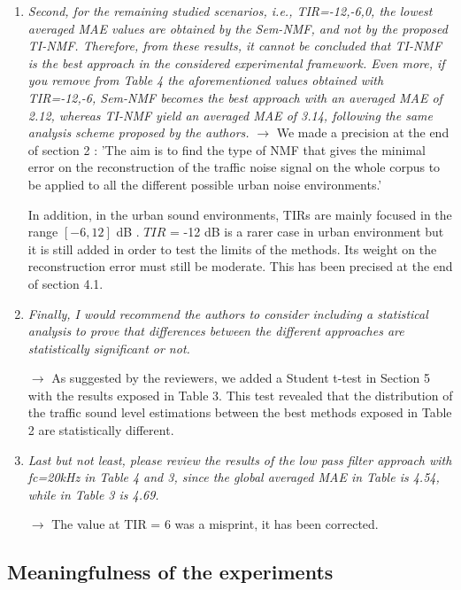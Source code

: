 \documentclass[10pt]{article}
\begin{document}
\begin{enumerate}
\item \emph{Second, for the remaining studied scenarios, i.e., TIR={-12,-6,0}, the lowest averaged MAE values are obtained by the Sem-NMF, and not by the proposed TI-NMF.
Therefore, from these results, it cannot be concluded that TI-NMF is the best approach in the considered experimental framework. Even more, if you remove from Table 4 the aforementioned values obtained with TIR={-12,-6}, Sem-NMF becomes the best approach with an averaged MAE of 2.12, whereas TI-NMF yield an averaged MAE of 3.14, following the same analysis scheme proposed by the authors.}
$\rightarrow$ We made a precision at the end of section 2 : 'The aim is to find the type of NMF that gives the minimal error on the reconstruction of the traffic noise signal on the whole corpus to be applied to all the different possible urban noise environments.'

In addition, in the urban sound environments, TIRs are mainly focused in the range $\left[-6, 12\right]$ dB \cite{gloaguen_creation_2017}. 
$TIR$ = -12 dB is a rarer case in urban environment but it is still added in order to test the limits of the methods.  Its weight on the reconstruction error must still be moderate. This has been precised at the end of section 4.1.


\item \emph{Finally, I would recommend the authors to consider including a statistical analysis to prove that differences between the different approaches are statistically significant or not.}

$\rightarrow$ As suggested by the reviewers, we added a Student t-test in Section 5 with the results exposed in Table 3. This test revealed that the distribution of the traffic sound level estimations between the best methods exposed in Table 2 are statistically different.

\item \emph{Last but not least, please review the results of the low pass filter approach with fc=20kHz in Table 4 and 3, since the global averaged MAE in Table is 4.54, while in Table 3 is 4.69.}

$\rightarrow$ The value at TIR = 6 was a misprint, it has been corrected.


\end{enumerate}

\subsection{Meaningfulness of the experiments}
\end{document}
